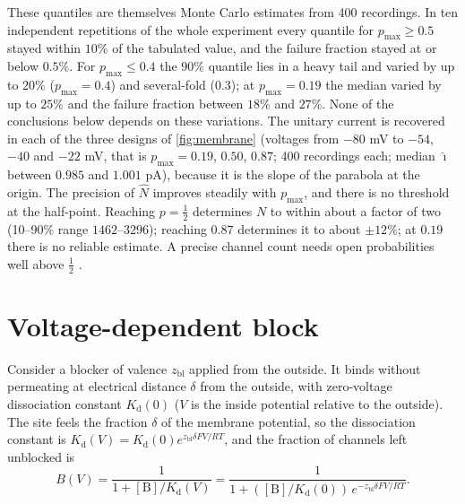 \documentclass[11pt]{article}
\theoremstyle{definition}\newtheorem{definition}[theorem]{Definition}
\theoremstyle{remark}\newtheorem{remark}[theorem]{Remark}
\begin{document}
These quantiles are themselves Monte Carlo estimates from 400 recordings. In ten independent repetitions of the whole experiment every quantile for $p_{\max}\ge0.5$ stayed within $10\%$ of the tabulated value, and the failure fraction stayed at or below $0.5\%$. For $p_{\max}\le0.4$ the 90\% quantile lies in a heavy tail and varied by up to $20\%$ ($p_{\max}=0.4$) and several-fold ($0.3$); at $p_{\max}=0.19$ the median varied by up to $25\%$ and the failure fraction between $18\%$ and $27\%$. None of the conclusions below depends on these variations. The unitary current is recovered in each of the three designs of \cref{fig:membrane} (voltages from $-80$ mV to $-54$, $-40$ and $-22$ mV, that is $p_{\max}=0.19$, $0.50$, $0.87$; 400 recordings each; median $\hat\imath$ between $0.985$ and $1.001$ pA), because it is the slope of the parabola at the origin. The precision of $\hat N$ improves steadily with $p_{\max}$, and there is no threshold at the half-point. Reaching $p=\frac12$ determines $N$ to within about a factor of two (10--90\% range $1462$--$3296$); reaching $0.87$ determines it to about $\pm12\%$; at $0.19$ there is no reliable estimate. A precise channel count needs open probabilities well above $\frac12$ \cite{AGL}.

\section{Voltage-dependent block}\label{sec:block}
Consider a blocker of valence $z_{\mathrm{bl}}$ applied from the outside. It binds without permeating at electrical distance $\delta$ from the outside, with zero-voltage dissociation constant $K_{\mathrm d}(0)$ ($V$ is the inside potential relative to the outside). The site feels the fraction $\delta$ of the membrane potential, so the dissociation constant is $K_{\mathrm d}(V)=K_{\mathrm d}(0)e^{z_{\mathrm{bl}}\delta FV/RT}$, and the fraction of channels left unblocked is \cite{Woodhull}
\[
B(V)=\frac1{1+[\mathrm B]/K_{\mathrm d}(V)}=\frac1{1+([\mathrm B]/K_{\mathrm d}(0))\,e^{-z_{\mathrm{bl}}\delta FV/RT}}.
\]
\end{document}
